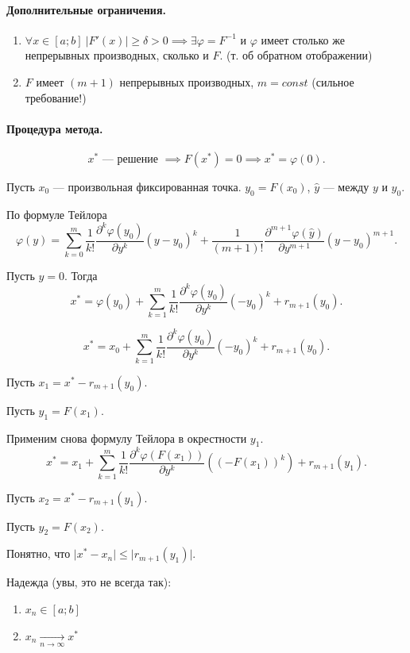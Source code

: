 \paragraph{Дополнительные ограничения.}
\begin{enumerate}
	\item $\forall x \in [a; b]\ \left| F'(x) \right| \ge \delta > 0 \implies \exists \varphi = F^{-1}$ и $\varphi$ имеет столько же непрерывных производных, сколько и $F$. (т. об обратном отображении)
	\item $F$ имеет $(m+1)$ непрерывных производных, $m = const$ (сильное требование!)
\end{enumerate}
\paragraph{Процедура метода.}
\[
	x^* \text{ --- решение } \implies F(x^*) = 0 \implies x^* = \varphi(0).
\]

Пусть $x_0$ --- произвольная фиксированная точка. $y_0 = F(x_0)$, $\hat{y}$ --- между $y$ и $y_0$.

По формуле Тейлора
\[
	\varphi(y) = \sum\limits_{k = 0}^m \frac{1}{k!} \frac{\partial^k \varphi(y_0)}{\partial y^k} (y-y_0)^k + \frac{1}{(m+1)!}\frac{\partial^{m+1}\varphi(\hat{y})}{\partial y^{m+1}}(y-y_0)^{m+1}.
\]

Пусть $y=0$. Тогда
\[
	x^* = \varphi(y_0) + \sum\limits_{k = 1}^m \frac{1}{k!} \frac{\partial^k \varphi(y_0)}{\partial y^k}(-y_0)^k + r_{m+1}(y_0).
\]

\[
	x^* = x_0 + \sum\limits_{k = 1}^m \frac{1}{k!} \frac{\partial^k \varphi(y_0)}{\partial y^k}(-y_0)^k + r_{m+1}(y_0).
\]

Пусть $x_1 = x^* - r_{m+1}(y_0)$.

Пусть $y_1 = F(x_1)$.

Применим снова формулу Тейлора в окрестности $y_1$.
\[
	x^* = x_1 + \sum\limits_{k=1}^m \frac{1}{k!}\frac{\partial^k\varphi(F(x_1))}{\partial y^k}((-F(x_1))^k) + r_{m+1}(y_1).
\]

Пусть $x_2 = x^* - r_{m+1}(y_1)$.

Пусть $y_2 = F(x_2)$.

Понятно, что $\vert x^* - x_{n}\vert \leq \vert r_{m+1}(y_1) \vert$.


Надежда (увы, это не всегда так):
\begin{enumerate}
	\item $x_n \in [a; b]$
	\item $x_n \underset{n \to \infty}{\longrightarrow} x^*$
\end{enumerate}

